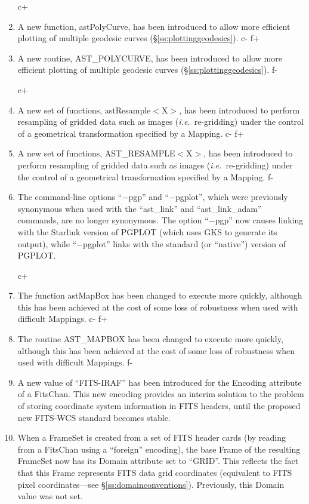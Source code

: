 \documentclass[twoside,11pt]{article}
\newcommand{\secref}[1]{\S\ref{#1}}
\newcommand{\secref}[1]{\ref{#1}}
\begin{document}
\begin{enumerate}
c+
\item A new function, astPolyCurve, has been introduced to allow more
efficient plotting of multiple geodesic curves
(\secref{ss:plottinggeodesics}).
c-
f+
\item A new routine, AST\_POLYCURVE, has been introduced to allow more
efficient plotting of multiple geodesic curves
(\secref{ss:plottinggeodesics}).
f-

c+
\item A new set of functions, astResample$<$X$>$, has been introduced
to perform resampling of gridded data such as images
({\em{i.e.}}\ re-gridding) under the control of a geometrical
transformation specified by a Mapping.
c-
f+
\item A new set of functions, AST\_RESAMPLE$<$X$>$, has been
introduced to perform resampling of gridded data such as images
({\em{i.e.}}\ re-gridding) under the control of a geometrical
transformation specified by a Mapping.
f-

\item The command-line options ``$-$pgp'' and ``$-$pgplot'', which
were previously synonymous when used with the ``ast\_link'' and
``ast\_link\_adam'' commands, are no longer synonymous. The option
``$-$pgp'' now causes linking with the Starlink version of PGPLOT
(which uses GKS to generate its output), while ``$-$pgplot'' links
with the standard (or ``native'') version of PGPLOT.

c+
\item The function astMapBox has been changed to execute more quickly,
although this has been achieved at the cost of some loss of robustness
when used with difficult Mappings.
c-
f+
\item The routine AST\_MAPBOX has been changed to execute more
quickly, although this has been achieved at the cost of some loss of
robustness when used with difficult Mappings.
f-

\item A new value of ``FITS-IRAF'' has been introduced for the
Encoding attribute of a FitsChan. This new encoding provides an
interim solution to the problem of storing coordinate system
information in FITS headers, until the proposed new FITS-WCS standard
becomes stable.

\item When a FrameSet is created from a set of FITS header cards (by
reading from a FitsChan using a ``foreign'' encoding), the base Frame
of the resulting FrameSet now has its Domain attribute set to
``GRID''. This reflects the fact that this Frame represents FITS data
grid coordinates (equivalent to FITS pixel coordinates---see
\secref{ss:domainconventions}). Previously, this Domain value was not
set.


\end{enumerate}
\end{document}
